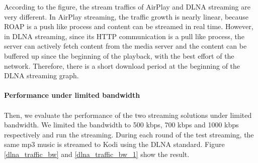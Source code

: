 According to the figure, the stream traffics of
AirPlay and DLNA streaming are very different. In AirPlay streaming, the traffic
growth is nearly linear, because ROAP is a push like process and content can be
streamed in real time. However, in DLNA streaming, since its HTTP communication is a pull
like process, the server can actively fetch content from the media server and the content can
be buffered  up since the beginning of the playback, with the best effort of the network.
Therefore, there is a short download period at the beginning of the DLNA
 streaming
graph. \\ 
\\
\textbf{Performance under limited bandwidth }\\
\\
Then, we evaluate the performance of  the two streaming solutions under limited bandwidth. We limited the bandwidth to 500 kbps, 700 kbps and 1000 kbps respectively and run the streaming. 
During each round of the test streaming, the same mp3 music is streamed to Kodi
using the DLNA standard. Figure \ref{dlna_traffic_bw} and
\ref{dlna_traffic_bw_1} show the result.


